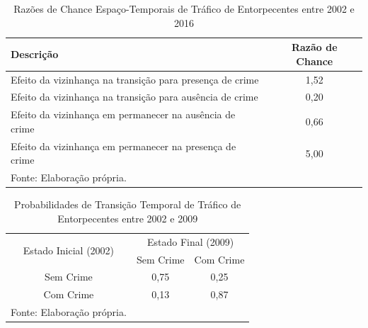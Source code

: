 \documentclass[12pt,openright,oneside,a4paper,english,french,spanish]{abntex2}
\numberwithin{table}{section} %
\numberwithin{figure}{section} %
\begin{document}
\begin{subappendices}
\begin{table}[H]
\centering
\caption{Razões de Chance Espaço-Temporais de Tráfico de Entorpecentes entre 2002 e 2016}
        \begin{tabular}{lc}
            \hline
            {\textbf{Descrição}} & {\textbf{Razão de Chance}} \\\hline
            {Efeito da vizinhança na transição para presença de crime} & {1,52} \\
            {Efeito da vizinhança na transição para ausência de crime} & {0,20} \\
            {Efeito da vizinhança em permanecer na ausência de crime} & {0,66} \\
            {Efeito da vizinhança em permanecer na presença de crime} & {5,00} \\\hline
            \tiny Fonte: Elaboração própria.
        \end{tabular}
    \label{tab:odds_espaco_tempo_trafico_2002_2016}
\end{table}














\begin{table}[H]
\centering
\caption{Probabilidades de Transição Temporal de Tráfico de Entorpecentes entre 2002 e 2009}
        \begin{tabular}{ccc}
            \hline
            \multirow{2}{*}{Estado Inicial (2002)} & \multicolumn{2}{c}{Estado Final (2009)}  \\\cline{2-3} 
                                     & \multicolumn{1}{l}{Sem Crime} & \multicolumn{1}{l}{Com Crime} \\\hline
            {Sem Crime} & {0,75} & {0,25} \\                \hline
            {Com Crime} & {0,13} & {0,87} \\                \hline
            \tiny Fonte: Elaboração própria.
        \end{tabular}
    \label{tab:prob_tempo_trafico_2002_2009}
\end{table}


\end{subappendices}
\end{document}
